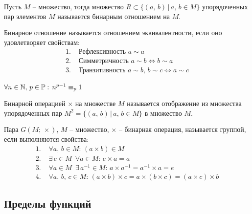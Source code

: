 \documentclass[12pt]{article}
\begin{document}
\begin{definition}
    Пусть $M$ -- множество, тогда множество $R \subset \{(a,\,b)\,|\,a,\,b\in M\}$ упорядоченных пар элементов $M$ называется бинарным отношением на $M$. 
\end{definition}

\begin{definition}
    Бинарное отношение называется отношением эквивалентности, если оно удовлетворяет свойствам:
    \begin{align*}
        1.\,\,&\text{Рефлексивность } a\sim a\\
        2.\,\,&\text{Симметричность } a\sim b \Longleftrightarrow b\sim a\\
        3.\,\,&\text{Транзитивность } a\sim b,\, b\sim c \Longleftrightarrow a\sim c
    \end{align*}
\end{definition}
\begin{theorem}
    $\forall n\in \mathbb{N},\, p\in \mathbb{P}:\, n^{p-1}\equiv_p 1$
\end{theorem}
\begin{definition}
    Бинарной операцией $\times$ на множестве $M$ называется отображение из множества упорядоченных пар $M^2=\{(a,\,b)\,|\,a,\,b\in M\}$ в множество $M$.
\end{definition}
\begin{definition}
    Пара $G(M;\,\times)$, $M$ -- множество, $\times$ -- бинарная операция, называется группой, если выполняются свойства:
    \begin{align*}
        1.\,\,&\forall a,\,b\in M:\,(a\times b)\in M\\
        2.\,\,&\exists\, e\in M\enspace\forall a\in M:\, e\times a=a\\
        3.\,\,&\forall a\in M\enspace \exists\, a^{-1}\in M:\, a\times a^{-1}=a^{-1}\times a=e\\
        4.\,\,&\forall a,\,b,\,c \in M:\,(a\times b)\times c=a\times(b\times c)= (a\times c)\times b
    \end{align*}
\end{definition}

\subsection{Пределы функций}
\end{document}
